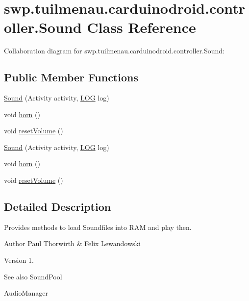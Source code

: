 \hypertarget{classswp_1_1tuilmenau_1_1carduinodroid_1_1controller_1_1_sound}{}\section{swp.\+tuilmenau.\+carduinodroid.\+controller.\+Sound Class Reference}
\label{classswp_1_1tuilmenau_1_1carduinodroid_1_1controller_1_1_sound}


Collaboration diagram for swp.\+tuilmenau.\+carduinodroid.\+controller.\+Sound\+:
\subsection*{Public Member Functions}
\begin{DoxyCompactItemize}
\item 
\hyperlink{classswp_1_1tuilmenau_1_1carduinodroid_1_1controller_1_1_sound_af59c1d12a6817625355f7803151e6e4b}{Sound} (Activity activity, \hyperlink{classswp_1_1tuilmenau_1_1carduinodroid_1_1model_1_1_l_o_g}{L\+O\+G} log)
\item 
void \hyperlink{classswp_1_1tuilmenau_1_1carduinodroid_1_1controller_1_1_sound_a065dfc4b7f9c45028ca6a16244a84e9b}{horn} ()
\item 
void \hyperlink{classswp_1_1tuilmenau_1_1carduinodroid_1_1controller_1_1_sound_ab29ad1d78fcd84ec47e6452d91bb3758}{reset\+Volume} ()
\item 
\hyperlink{classswp_1_1tuilmenau_1_1carduinodroid_1_1controller_1_1_sound_af59c1d12a6817625355f7803151e6e4b}{Sound} (Activity activity, \hyperlink{classswp_1_1tuilmenau_1_1carduinodroid_1_1model_1_1_l_o_g}{L\+O\+G} log)
\item 
void \hyperlink{classswp_1_1tuilmenau_1_1carduinodroid_1_1controller_1_1_sound_a065dfc4b7f9c45028ca6a16244a84e9b}{horn} ()
\item 
void \hyperlink{classswp_1_1tuilmenau_1_1carduinodroid_1_1controller_1_1_sound_ab29ad1d78fcd84ec47e6452d91bb3758}{reset\+Volume} ()
\end{DoxyCompactItemize}


\subsection{Detailed Description}
Provides methods to load Soundfiles into R\+A\+M and play then.

\begin{DoxyAuthor}{Author}
Paul Thorwirth \& Felix Lewandowski 
\end{DoxyAuthor}
\begin{DoxyVersion}{Version}
1. 
\end{DoxyVersion}
\begin{DoxySeeAlso}{See also}
Sound\+Pool 

Audio\+Manager 
\end{DoxySeeAlso}


